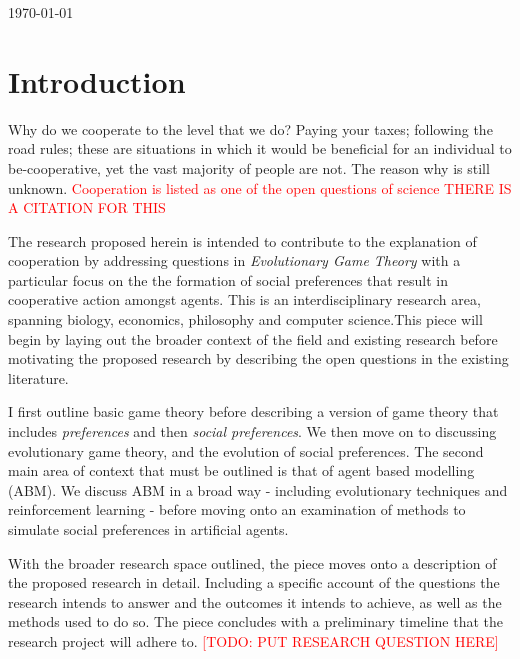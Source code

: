 \documentclass[12pt]{article}
\newcommand{\todo}[1]{\textcolor{red}{[TODO: #1]}\PackageWarning{TODO:}{#1!}}
\newcommand*{\np}{\par\noindent\newline}
\begin{document}
\begin{titlepage}
	\vfill\vfill\vfill %
	
	{\large\today} %
	
	
	 
	
	\vfill %
	
\end{titlepage}
\hypersetup{colorlinks, citecolor=black, filecolor=black, linkcolor=black urlcolor=black}

\newpage
\tableofcontents
\newpage
\section{Introduction}
Why do we cooperate to the level that we do? Paying your taxes; following the
road rules; these are situations in which it would be beneficial for an
individual to be-cooperative, yet the vast majority of people are not. The
reason why is still unknown. \textcolor{red}{Cooperation is listed as one of
the open questions of science THERE IS A CITATION FOR THIS}
\np The research proposed herein is intended to contribute to the explanation
of cooperation by addressing questions in \textit{Evolutionary Game Theory}
with a particular focus on the the formation of social preferences that result
in cooperative action amongst agents. This is an interdisciplinary research
area, spanning biology, economics, philosophy and computer science.This piece
will begin by laying out the broader context of the field and existing research
before motivating the proposed research by describing the open questions in the
existing literature.
\np I first outline basic game theory before describing a version of
game theory that includes \textit{preferences} and then \textit{social
preferences}. We then move on to discussing evolutionary game theory, and the
evolution of social preferences. The second main area of context that must be
outlined is that of agent based modelling (ABM). We discuss ABM in a broad way
- including evolutionary techniques and reinforcement learning - before moving
onto an examination of methods to simulate social preferences in artificial
agents.
\np With the broader research space outlined, the piece moves onto a
description of the proposed research in detail. Including a specific account of
the questions the research intends to answer and the outcomes it intends to
achieve, as well as the methods used to do so. The piece concludes with a
preliminary timeline that the research project will adhere to. 
\todo{PUT RESEARCH QUESTION HERE}
\end{document}
